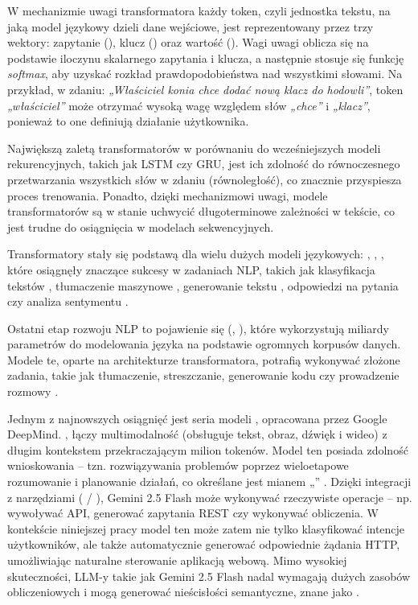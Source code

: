 	W mechanizmie uwagi transformatora każdy token, czyli jednostka tekstu, na jaką model językowy dzieli dane wejściowe, jest reprezentowany przez trzy wektory: zapytanie (), klucz () oraz wartość (). Wagi uwagi oblicza się na podstawie iloczynu skalarnego zapytania i klucza, a następnie stosuje się funkcję \textit{softmax}, aby uzyskać rozkład prawdopodobieństwa nad wszystkimi słowami. Na przykład, w zdaniu:  \textit{„Właściciel konia chce dodać nową klacz do hodowli”},  token \textit{„właściciel”} może otrzymać wysoką wagę względem słów \textit{„chce”} i \textit{„klacz”}, ponieważ to one definiują działanie użytkownika.
	
	Największą zaletą transformatorów w porównaniu do wcześniejszych modeli rekurencyjnych, takich jak LSTM\cite{hochreiter1997lstm} czy GRU\cite{cho2014gru}, jest ich zdolność do równoczesnego przetwarzania wszystkich słów w zdaniu (równoległość), co znacznie przyspiesza proces trenowania. Ponadto, dzięki mechanizmowi uwagi, modele transformatorów są w stanie uchwycić długoterminowe zależności w tekście, co jest trudne do osiągnięcia w modelach sekwencyjnych.
	
	Transformatory stały się podstawą dla wielu dużych modeli językowych:  \cite{devlin2018bert},  \cite{radford2019gpt2},  \cite{brown2020language}, które osiągnęły znaczące sukcesy w zadaniach NLP, takich jak klasyfikacja tekstów \cite{devlin2018bert}, tłumaczenie maszynowe \cite{vaswani2017attention}, generowanie tekstu \cite{brown2020language}, odpowiedzi na pytania \cite{devlin2018bert} czy analiza sentymentu \cite{devlin2018bert}.

    Ostatni etap rozwoju NLP to pojawienie się  (, ), które wykorzystują miliardy parametrów do modelowania języka na podstawie ogromnych korpusów danych. Modele te, oparte na architekturze transformatora, potrafią wykonywać złożone zadania, takie jak tłumaczenie, streszczanie, generowanie kodu czy prowadzenie rozmowy \cite{openai2023gpt4technicalreport}.
    
    Jednym z najnowszych osiągnięć jest seria modeli , opracowana przez Google DeepMind. , łączy multimodalność (obsługuje tekst, obraz, dźwięk i wideo) z długim kontekstem przekraczającym milion tokenów. Model ten posiada zdolność wnioskowania -- tzn. rozwiązywania problemów poprzez wieloetapowe rozumowanie i planowanie działań, co określane jest mianem „” \cite{deepmind2025gemini}.  
    Dzięki integracji z narzędziami ( / ), Gemini 2.5 Flash może wykonywać rzeczywiste operacje -- np. wywoływać API, generować zapytania REST czy wykonywać obliczenia. W kontekście niniejszej pracy model ten może zatem nie tylko klasyfikować intencje użytkowników, ale także automatycznie generować odpowiednie żądania HTTP, umożliwiając naturalne sterowanie aplikacją webową.  
    Mimo wysokiej skuteczności, LLM-y takie jak Gemini 2.5 Flash nadal wymagają dużych zasobów obliczeniowych i mogą generować nieścisłości semantyczne, znane jako  \cite{bommasani2021opportunities}.

